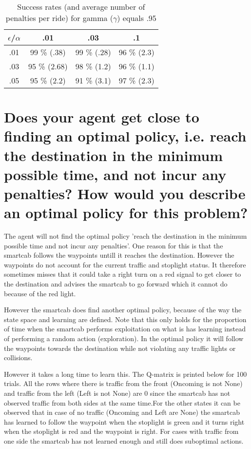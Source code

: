\documentclass{article}
\begin{document}
\begin{table}
\centering
\begin{tabular}{c | c | c | c |}
\hline
$\epsilon$/$\alpha$ & .01 & .03 & .1 \\ \hline
.01 & 99 \% (.38)& 99 \% (.28)& 96 \% (2.3)\\ \hline
.03 & 95 \% (2.68)& 98 \% (1.2)& 96 \% (1.1)\\ \hline
.05 & 95 \% (2.2)& 91 \% (3.1)& 97 \% (2.3)\\  \hline
\end{tabular}
\caption{Success rates (and average number of penalties per ride) for gamma ($\gamma$) equals .95}
\end{table}

\section*{Does your agent get close to finding an optimal policy, i.e. reach the destination in the minimum possible time, and not incur any penalties? How would you describe an optimal policy for this problem?}

The agent will not find the optimal policy 'reach the destination in the minimum possible time and not incur any penalties'. One reason for this is that the smartcab follows the waypoints untill it reaches the destination. However the waypoints do not account for the current traffic and stoplight status. It therefore sometimes misses that it could take a right turn on a red signal to get closer to the destination and advises the smartcab to go forward which it cannot do because of the red light.

However the smartcab does find another optimal policy, because of the way the state space and learning are defined. Note that this only holds for the proportion of time when the smartcab performs exploitation on what is has learning instead of performing a random action (exploration). In the optimal policy it will follow the waypoints towards the destination while not violating any traffic lights or collisions. 

However it takes a long time to learn this. The Q-matrix is printed below for 100 trials. All the rows where there is traffic from the front (Oncoming is not None) and traffic from the left (Left is not None) are 0 since the smartcab has not observed traffic from both sides at the same time.For the other states it can be observed that in case of no traffic (Oncoming and Left are None) the smartcab has learned to follow the waypoint when the stoplight is green and it turns right when the stoplight is red and the waypoint is right. For cases with traffic from one side the smartcab has not learned enough and still does suboptimal actions. 
\end{document}
